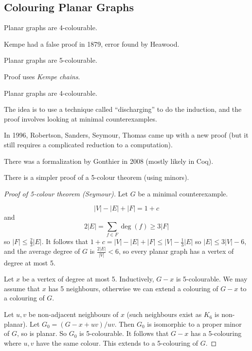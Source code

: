 \documentclass[main.tex]{subfiles}
\begin{document}
\subsection{Colouring Planar Graphs}%
\begin{conjecture}[Guthrie 1952]
  Planar graphs are 4-colourable.
\end{conjecture}
Kempe had a false proof in 1879, error found by Heawood.
\begin{theorem}[Heawood 1922]
  Planar graphs are 5-colourable.
\end{theorem}
Proof uses \textit{Kempe chains}.
\begin{theorem}
  Planar graphs are 4-colourable.
\end{theorem}
The idea is to use a technique called ``discharging'' to do the induction,
and the proof involves looking at minimal counterexamples.

In 1996, Robertson, Sanders, Seymour, Thomas came up with a new proof
(but it still requires a complicated reduction to a computation).

There was a formalization by Gonthier in 2008 (mostly likely in Coq).

There is a simpler proof of a 5-colour theorem (using minors).
\begin{proof}[Proof of 5-colour theorem (Seymour)]
  Let $G$ be a minimal counterexample.
  \begin{fact*}
    \leavevmode\vspace{-0.5em}
    \[
      |V| - |E| + |F| = 1 + c
    \]
    and
    \[
      2|E| = \sum_{f\in F}\deg(f)\geq 3|F|
    \]
    so $|F|\leq\frac 2 3|E|$.
    It follows that $1 + c = |V| - |E| + |F|\leq|V| - \frac 1 3|E|$ so
    $|E|\leq 3|V| - 6$, and the average degree of $G$ is $\frac{2|E|}{|V|} < 6$,
    so every planar graph has a vertex of degree at most 5.
  \end{fact*}
  Let $x$ be a vertex of degree at most 5.
  Inductively, $G - x$ is 5-colourable.
  We may assume that $x$ has 5 neighbours, otherwise we can extend a colouring
  of $G - x$ to a colouring of $G$.

  Let $u,v$ be non-adjacent neighbours of $x$ (such neighbours exist as $K_6$
  is non-planar).
  Let $G_0 = (G - x + uv)/uv$.
  Then $G_0$ is isomorphic to a proper minor of $G$, so is planar.
  So $G_0$ is 5-colourable.
  It follows that $G-x$ has a 5-colouring where $u, v$ have the same colour.
  This extends to a 5-colouring of $G$.
\end{proof}
\end{document}
